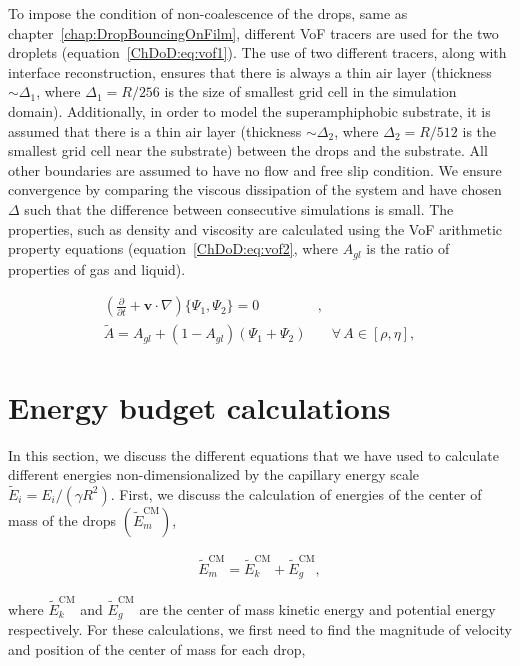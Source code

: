 \begin{subappendices}
	To impose the condition of non-coalescence of the drops, same as chapter~\ref{chap:DropBouncingOnFilm}, different VoF tracers are used for the two droplets (equation~\ref{ChDoD:eq:vof1}). The use of two different tracers, along with interface reconstruction, ensures that there is always a thin air layer (thickness $\sim \Delta_1$, where $\Delta_1=R/256$ is the size of smallest grid cell in the simulation domain). Additionally, in order to model the superamphiphobic substrate, it is assumed that there is a thin air layer (thickness $\sim \Delta_2$, where $\Delta_2 = R/512$ is the smallest grid cell near the substrate) between the drops and the substrate. All other boundaries are assumed to have no flow and free slip condition. We ensure convergence by comparing the viscous dissipation of the system and have chosen $\Delta$ such that the difference between consecutive simulations is small. The properties, such as density and viscosity are calculated using the VoF arithmetic property equations (equation~\ref{ChDoD:eq:vof2}, where $A_{gl}$ is the ratio of properties of gas and liquid).
	
	\begin{align}
		\label{ChDoD:eq:vof1}
		\left(\frac{\partial}{\partial t} + \boldsymbol{v\cdot}\nabla\right)\{\Psi_1,\Psi_2\} = 0&,\\
		\label{ChDoD:eq:vof2}
		\tilde{A} = A_{gl} + \left(1 - A_{gl}\right)\left(\Psi_1 + \Psi_2\right)& \quad\forall\,A\in\left[\rho, \eta\right],
	\end{align}
	
	\section{Energy budget calculations}\label{ChDoD:sec:EnergyBudgetCalculations}
	
	In this section, we discuss the different equations that we have used to calculate different energies non-dimensionalized by the capillary energy scale $\tilde{E}_i = E_i/\left(\gamma R^2\right)$. First, we discuss the calculation of energies of the center of mass of the drops $\left(\tilde{E}_m^\text{CM}\right)$,
	
	\begin{align}
		\label{ChDoD:eq:energyCM}
		\tilde{E}_m^\text{CM} = \tilde{E}_k^\text{CM} + \tilde{E}_g^\text{CM},
	\end{align}
	
	\noindent where $\tilde{E}_k^\text{CM}$ and $\tilde{E}_g^\text{CM}$ are the center of mass kinetic energy and potential energy respectively. For these calculations, we first need to find the magnitude of velocity and position of the center of mass for each drop, 
	

\end{subappendices}
